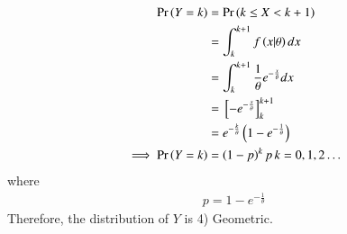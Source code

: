 \begin{align}
    \Pr\left(Y=k\right) &= \Pr\left(k\leq X < k+1\right)\\
    &= \int_k^{k+1}f\left(x|\theta\right)dx\\
    &= \int_k^{k+1}\frac{1}{\theta}e^{-\frac{x}{\theta}}dx\\
    &= {}\left[-e^{-\frac{x}{\theta}}\right]_k^{k+1}\\
 &= e^{-\frac{k}{\theta}}\left(1-e^{-\frac{1}{\theta}}\right)
 \\
 \implies     \Pr\left(Y=k\right) &= \left(1-p\right)^k p \, k=0,1,2\ldots
\end{align}
%
where
\begin{align}
    p=1-e^{-\frac{1}{\theta}}
\end{align}
Therefore, the distribution of $Y$ is 4) Geometric.
